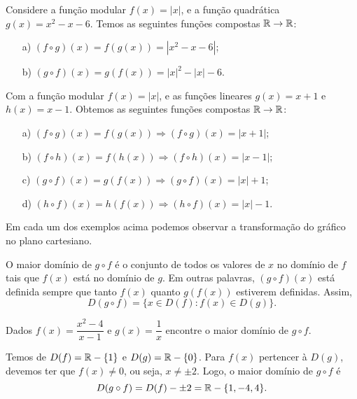 \begin{exem}
Considere a função modular $f(x)= |x|$, e a função quadrática $g(x)= x^2-x-6$. Temos as seguintes funções compostas $\mathbb{R} \to \mathbb{R}$:
\begin{enumerate}
\item [a)] $(f \circ g)(x)= f(g(x))= |x^2-x-6|$;
\item [b)] $(g \circ f)(x)= g(f(x))= |x|^2 - |x|- 6$.
\end{enumerate}
\end{exem}

\begin{exem}
Com a função modular $f(x)= |x|$, e as funções lineares $g(x)= x+1$ e $h(x)= x-1$. Obtemos as seguintes funções compostas $\mathbb{R} \to \mathbb{R}$:
\begin{enumerate}
\item [a)] $(f \circ g)(x)= f(g(x)) \Rightarrow (f \circ g)(x)= |x+1|$;
\item [b)] $(f \circ h)(x)= f(h(x)) \Rightarrow (f \circ h)(x)= |x-1|$;
\item [c)] $(g \circ f)(x)= g(f(x)) \Rightarrow (g \circ f)(x)= |x|+1$;
\item [d)] $(h \circ f)(x)= h(f(x)) \Rightarrow (h \circ f)(x)= |x|-1$.
\end{enumerate}
Em cada um dos exemplos acima podemos observar a transformação do gráfico no plano cartesiano.
\end{exem}

O maior domínio de $g\circ f$ é o conjunto de todos os valores de $x$ no domínio de $f$ tais que $f(x)$ está no domínio de $g$. Em outras palavras, $(g\circ f)(x)$ está definida sempre que tanto $f(x)$ quanto $g(f(x))$ estiverem definidas.
Assim, 
\begin{equation*}
D(g \circ f)=\{ x\in D(f) \colon f(x) \in D(g)\}.    
\end{equation*}

\begin{exem}
    Dados $f(x)=\dfrac{x^2-4}{x-1}$ e $g(x)=\dfrac{1}{x}$ encontre o maior domínio de $g\circ f$.

    Temos de $D(f)=\mathbb{R}-\{1\}$ e $D(g)=\mathbb{R}-\{0\}$. Para $f(x)$ pertencer à $D(g)$, devemos ter que $f(x)\neq 0$, ou seja, $x\neq \pm 2$. Logo, o maior domínio de $g\circ f$ é
    \begin{equation*}
        D(g\circ f) = D(f)-{\pm 2} = \mathbb{R}-\{1,-4,4\}.
    \end{equation*}
\end{exem}


